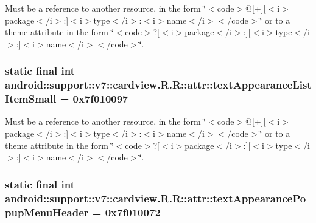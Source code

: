 Must be a reference to another resource, in the form \char`\"{}$<$code$>$@\mbox{[}+\mbox{]}\mbox{[}$<$i$>$package$<$/i$>$:\mbox{]}$<$i$>$type$<$/i$>$:$<$i$>$name$<$/i$>$$<$/code$>$\char`\"{} or to a theme attribute in the form \char`\"{}$<$code$>$?\mbox{[}$<$i$>$package$<$/i$>$:\mbox{]}\mbox{[}$<$i$>$type$<$/i$>$:\mbox{]}$<$i$>$name$<$/i$>$$<$/code$>$\char`\"{}. \hypertarget{classandroid_1_1support_1_1v7_1_1cardview_1_1_r_1_1attr_869a82d546e160f677fc9aff5ba47000}{
\subsubsection[{textAppearanceListItemSmall}]{\setlength{\rightskip}{0pt plus 5cm}static final int android::support::v7::cardview.R.R::attr::textAppearanceListItemSmall = 0x7f010097}}
\label{classandroid_1_1support_1_1v7_1_1cardview_1_1_r_1_1attr_869a82d546e160f677fc9aff5ba47000}


Must be a reference to another resource, in the form \char`\"{}$<$code$>$@\mbox{[}+\mbox{]}\mbox{[}$<$i$>$package$<$/i$>$:\mbox{]}$<$i$>$type$<$/i$>$:$<$i$>$name$<$/i$>$$<$/code$>$\char`\"{} or to a theme attribute in the form \char`\"{}$<$code$>$?\mbox{[}$<$i$>$package$<$/i$>$:\mbox{]}\mbox{[}$<$i$>$type$<$/i$>$:\mbox{]}$<$i$>$name$<$/i$>$$<$/code$>$\char`\"{}. \hypertarget{classandroid_1_1support_1_1v7_1_1cardview_1_1_r_1_1attr_49ddd6f1d69ed2611f9289e6414946ae}{
\subsubsection[{textAppearancePopupMenuHeader}]{\setlength{\rightskip}{0pt plus 5cm}static final int android::support::v7::cardview.R.R::attr::textAppearancePopupMenuHeader = 0x7f010072}}
\label{classandroid_1_1support_1_1v7_1_1cardview_1_1_r_1_1attr_49ddd6f1d69ed2611f9289e6414946ae}


